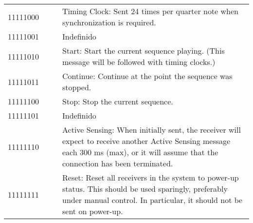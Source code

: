 
        \begin{center}
        \tablelasttail{\hline}
        \begin{supertabular}{| C{2cm} | C{2cm} | C{2.3cm} | C{8cm} |}
             11111000 &  &  & Timing Clock: Sent 24 times per quarter note when synchronization is required. \\
                11111001 &  &  & Indefinido \\
             11111010 &  &  & Start: Start the current sequence playing. (This message will be followed with timing clocks.) \\
                11111011 &  &  & Continue: Continue at the point the sequence was stopped. \\
             11111100 &  &  & Stop: Stop the current sequence. \\
                11111101 &  &  & Indefinido           \\
             11111110 &  &  & Active Sensing: When initially sent, the receiver will expect to receive another Active Sensing message each 300 ms (max), or it will assume that the connection has been terminated. \\
                11111111 &  &  & Reset: Reset all receivers in the system to power-up status. This should be used sparingly, preferably under manual control. In particular, it should not be sent on power-up. \\
        \end{supertabular}
        \end{center} 
        
